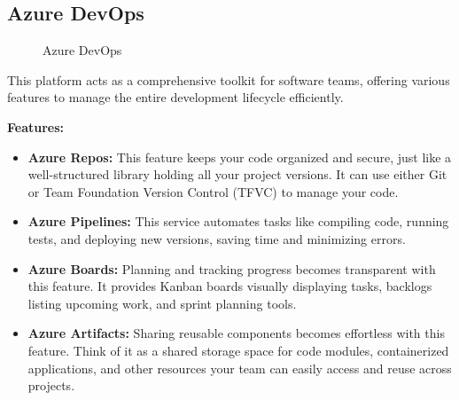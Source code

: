 \subsection{Azure DevOps}

\begin{figure}[htpb]
    \centering
    \caption{Azure DevOps}
    \label{fig:Azure_DevOps}
\end{figure}

This platform acts as a comprehensive toolkit for software teams, offering various features to manage the entire development lifecycle efficiently.
\par
\textbf{Features:}
\begin{itemize}
    \item \textbf{Azure Repos:} This feature keeps your code organized and secure, just like a well-structured library holding all your project versions. It can use either Git or Team Foundation Version Control (TFVC) to manage your code.
    \item \textbf{Azure Pipelines:}  This service automates tasks like compiling code, running tests, and deploying new versions, saving time and minimizing errors.
    \item \textbf{Azure Boards:} Planning and tracking progress becomes transparent with this feature. It provides Kanban boards visually displaying tasks, backlogs listing upcoming work, and sprint planning tools.
    \item \textbf{Azure Artifacts:} Sharing reusable components becomes effortless with this feature. Think of it as a shared storage space for code modules, containerized applications, and other resources your team can easily access and reuse across projects.
\end{itemize}

